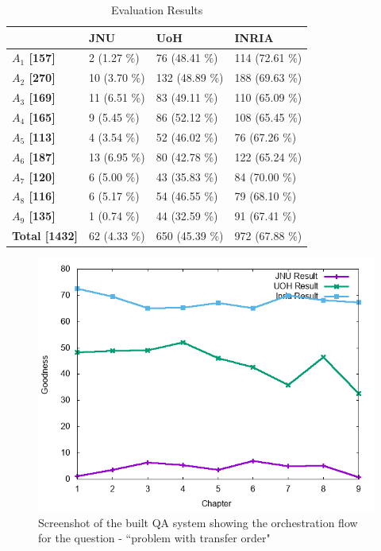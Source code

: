 \documentclass[11pt]{article}
\begin{document}
\begin{table}[h]
\begin{center}
\begin{tabular}{p{1.4cm} | p{1.6cm} | p{1.5cm} | p{1.5cm}}
\hline 
 & \bf JNU & \bf UoH & \bf INRIA \\ 
 \hline
 
\bf $A_1$ [157] &   2 (1.27 \%) &   76 (48.41 \%) &   114 (72.61 \%) \\
\bf $A_2$ [270] &   10 (3.70 \%) &   132 (48.89 \%) &   188 (69.63 \%) \\
\bf $A_3$ [169] &   11 (6.51 \%) &   83 (49.11 \%) &   110 (65.09 \%) \\
\bf $A_4$ [165] &   9 (5.45 \%) &   86 (52.12 \%) &   108 (65.45 \%) \\
\bf $A_5$ [113] &   4 (3.54 \%) &   52 (46.02 \%) &   76 (67.26 \%) \\
\bf $A_6$ [187] &   13 (6.95 \%) &   80 (42.78 \%) &   122 (65.24 \%) \\
\bf $A_7$ [120] &   6 (5.00 \%) &   43 (35.83 \%) &   84 (70.00 \%) \\
\bf $A_8$ [116] &   6 (5.17 \%) &   54 (46.55 \%) &   79 (68.10 \%) \\
\bf $A_9$ [135] &   1 (0.74 \%) &   44 (32.59 \%) &   91 (67.41 \%) \\
\bf Total [1432] &   62 (4.33 \%) &   650 (45.39 \%) &   972 (67.88 \%) \\
 
\hline
\end{tabular}
\end{center}
\caption{\label{font-table} Evaluation Results }
\end{table}


\begin{figure}[h]
	\center
	\includegraphics[scale=0.34]{images/split.png}
	\caption{\label{screen}Screenshot of the built QA system showing the orchestration flow for the question - ``problem with transfer order"}
\end{figure}
\end{document}
